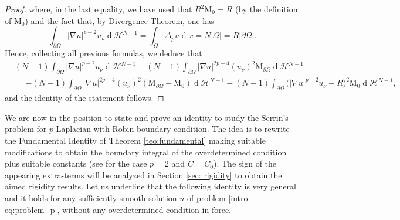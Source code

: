 \documentclass[10pt,a4paper, reqno]{amsart}
\numberwithin{equation}{section}
\renewcommand{\d}[1]{\ensuremath{\operatorname{d}\!{#1}}}
\begin{document}
\begin{proof}
    where, in the last equality, we have used that $R^2 \mathrm{M}_{0} = R$ (by the definition of $\mathrm{M}_0$) and the fact that, by Divergence Theorem, one has
    \begin{equation}\label{eq: boundary int of u_nu = N Omega}
        \int_{\partial\Omega} |\nabla u|^{p-2} u_\nu \d{}\mathcal{H}^{N-1} = \int_{\Omega} \Delta_p u \d{}x = N|\Omega| = R |\partial\Omega|. 
    \end{equation}
    Hence, collecting all previous formulas, we deduce that
    \begin{equation*}
    \begin{aligned}
        &(N-1) \int_{\partial\Omega} |\nabla u|^{p-2} u_\nu \d{}\mathcal{H}^{N-1} - (N-1) \int_{\partial\Omega} |\nabla u|^{2p-4} (u_\nu)^2 \mathrm{M}_{\partial\Omega} \d{}\mathcal{H}^{N-1}
        \\
        &= - (N-1) \int_{\partial\Omega} |\nabla u|^{2p-4} (u_\nu)^2 (\mathrm{M}_{\partial\Omega} - \mathrm{M}_{0} ) \d{}\mathcal{H}^{N-1}   - (N-1) \int_{\partial\Omega} \Big(|\nabla u|^{p-2} u_\nu - R \Big)^2  \mathrm{M}_{0} \d{}\mathcal{H}^{N-1},
    \end{aligned}
    \end{equation*}
    and the identity of the statement follows.
\end{proof}
    
We are now in the position to state and prove an identity to study the Serrin's problem for $p$-Laplacian with Robin boundary condition. The idea is to rewrite the Fundamental Identity of Theorem \ref{teo:fundamental} making suitable modifications to obtain the boundary integral of the overdetermined condition plus suitable constants (see \cite[Thm. 5]{gamo26} for the case $p=2$ and $C=C_0$). The sign of the appearing extra-terms will be analyzed in Section \ref{sec: rigidity} to obtain the aimed rigidity results. Let us underline that the following identity is very general and it holds for any sufficiently smooth solution $u$ of problem \eqref{intro eq:problem_p}, without any overdetermined condition in force.
\end{document}
